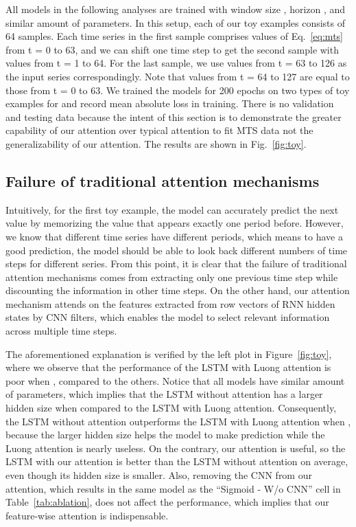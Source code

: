 All models in the following analyses are trained with window size , horizon , and similar amount of parameters.
In this setup, each of our toy examples consists of 64 samples.
Each time series in the first sample comprises values of Eq.~\ref{eq:mts} from t = 0 to 63, and
we can shift one time step to get the second sample with values from t = 1 to 64.
For the last sample, we use values from t = 63 to 126 as the input series correspondingly.
Note that values from t = 64 to 127 are equal to those from t = 0 to 63.
We trained the models for 200 epochs on two types of toy examples for  and record mean absolute loss in training.
There is no validation and testing data because the intent of this section is to demonstrate the greater capability of our attention over typical attention to fit MTS data not the generalizability of our attention.
The results are shown in Fig.~\ref{fig:toy}.

\subsection{Failure of traditional attention mechanisms}
Intuitively, for the first toy example, the model can accurately predict the next value by memorizing the value that appears exactly one period before. 
However, we know that different time series have different periods, which means to have a good prediction, the model should be able to look back different numbers of time steps for different series. From this point, it is clear that the failure of traditional attention mechanisms comes from extracting only one previous time step while discounting the information in other time steps.
On the other hand, our attention mechanism attends on the features extracted from row vectors of RNN hidden states by CNN filters, which enables the model to select relevant information across multiple time steps.

The aforementioned explanation is verified by the left plot in Figure~\ref{fig:toy}, where we observe that the performance of the LSTM with Luong attention is poor when , compared to the others.
Notice that all models have similar amount of parameters, which implies that the LSTM without attention has a larger hidden size when compared to the LSTM with Luong attention.
Consequently, the LSTM without attention outperforms the LSTM with Luong attention when , because the larger hidden size helps the model to make prediction while the Luong attention is nearly useless.
On the contrary, our attention is useful, so the LSTM with our attention is better than the LSTM without attention on average, even though its hidden size is smaller.
Also, removing the CNN from our attention, which results in the same model as the ``Sigmoid - W/o CNN'' cell in Table~\ref{tab:ablation}, does not affect the performance, which implies that our feature-wise attention is indispensable.

